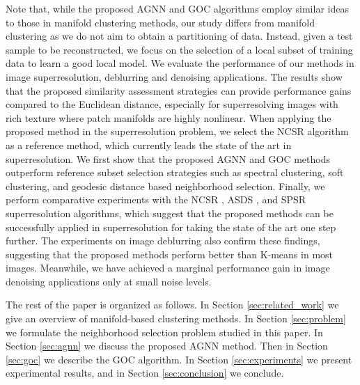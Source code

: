 \documentclass[journal]{IEEEtran}
\begin{document}
Note that, while the proposed AGNN and GOC algorithms employ similar ideas to those in manifold clustering methods, our study differs from manifold clustering as we do not aim to obtain a partitioning of data.  Instead, given a test sample to be reconstructed, we focus on the selection of a local subset of training data to learn a good local model. We evaluate the performance of our methods in image superresolution, deblurring and denoising applications. The results  show that the proposed similarity assessment strategies can provide performance gains compared to the Euclidean distance, especially for superresolving images with rich texture where patch manifolds are highly nonlinear. When applying the proposed method in the superresolution problem, we select the NCSR algorithm \cite{Dong13nonlocally} as a reference method, which currently leads the state of the art in superresolution. 
We first show that the proposed AGNN and GOC methods outperform reference subset selection strategies such as spectral clustering, soft clustering, and geodesic distance based neighborhood selection. Finally, we perform comparative experiments with the NCSR \cite{Dong13nonlocally}, ASDS \cite{Dong11image}, and SPSR \cite{Peleg14a} superresolution algorithms, which suggest that the proposed methods can be successfully applied in superresolution for taking the state of the art one step further. The experiments on image deblurring also confirm these findings, suggesting that the proposed methods perform better than K-means in most images. Meanwhile, we have achieved a marginal performance gain in image denoising applications only at small noise levels.


The rest of the paper is organized as follows. In Section \ref{sec:related_work} we give an overview of manifold-based clustering methods. In Section \ref{sec:problem} we formulate the neighborhood selection problem studied in this paper. In Section \ref{sec:agnn} we discuss the proposed AGNN method. Then in Section \ref{sec:goc} we describe the GOC algorithm. In Section \ref{sec:experiments} we present experimental results, and in Section \ref{sec:conclusion} we conclude. 
\end{document}
